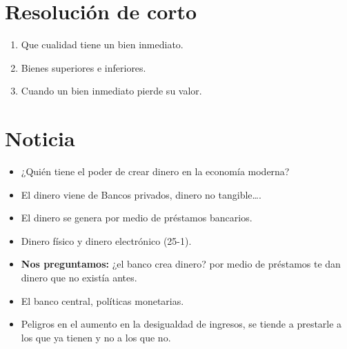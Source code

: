 \section{Resolución de corto}
\begin{enumerate}
    \item Que cualidad tiene un bien inmediato.
    \item Bienes superiores e inferiores.
    \item Cuando un bien inmediato pierde su valor.
\end{enumerate}

\section{Noticia}
\begin{itemize}
    \item ¿Quién tiene el poder de crear dinero en la economía moderna?
    \item El dinero viene de Bancos privados, dinero no tangible\dots.
    \item El dinero se genera por medio de préstamos bancarios.
    \item Dinero físico y dinero electrónico (25-1).
    \item \textbf{Nos preguntamos:} ¿el banco crea dinero? por medio de préstamos te dan dinero que no existía antes.
    \item El banco central, políticas monetarias.
    \item Peligros en el aumento en la desigualdad de ingresos, se tiende a prestarle a los que ya tienen y no a los que no.
\end{itemize}

